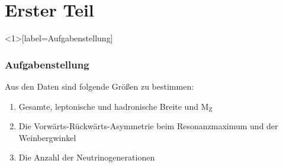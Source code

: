 \documentclass{beamer}
\begin{document}
\section{Erster Teil}
%

\begin{frame}<1>[label=Aufgabenstellung]
	\frametitle{Aufgabenstellung}
	Aus den Daten sind folgende Größen zu bestimmen: 
	\begin{enumerate}
		\item Gesamte, leptonische und hadronische Breite und M$_\text{Z}$
		\item<2-> Die Vorwärts-Rückwärts-Asymmetrie beim Resonanzmaximum und der Weinbergwinkel
		\item<3> Die Anzahl der Neutrinogenerationen
	\end{enumerate}
\end{frame}





\end{document}

